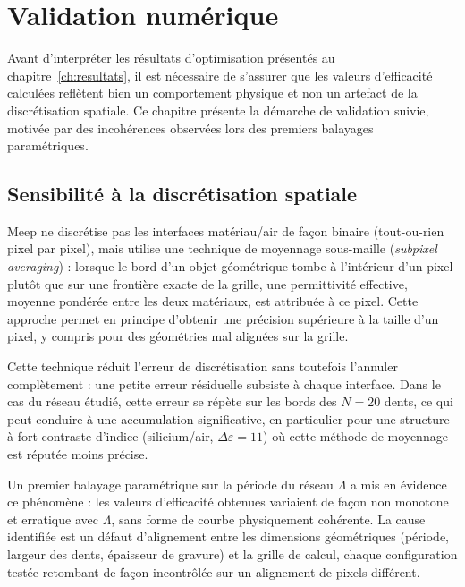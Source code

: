 \documentclass[a4paper,11pt]{report}
\begin{document}
\chapter{Validation numérique}
\label{ch:validation}


Avant d'interpréter les résultats d'optimisation présentés au chapitre~\ref{ch:resultats}, il est nécessaire de s'assurer que les valeurs d'efficacité calculées reflètent bien un comportement physique et non un artefact de la discrétisation spatiale. Ce chapitre présente la démarche de validation suivie, motivée par des incohérences observées lors des premiers balayages paramétriques.

\section{Sensibilité à la discrétisation spatiale}

Meep ne discrétise pas les interfaces matériau/air de façon binaire (tout-ou-rien pixel par pixel), mais utilise une technique de moyennage sous-maille (\emph{subpixel averaging}) : lorsque le bord d'un objet géométrique tombe à l'intérieur d'un pixel plutôt que sur une frontière exacte de la grille, une permittivité effective, moyenne pondérée entre les deux matériaux, est attribuée à ce pixel. Cette approche permet en principe d'obtenir une précision supérieure à la taille d'un pixel, y compris pour des géométries mal alignées sur la grille.

Cette technique réduit l'erreur de discrétisation sans toutefois l'annuler complètement : une petite erreur résiduelle subsiste à chaque interface. Dans le cas du réseau étudié, cette erreur se répète sur les bords des $N=20$ dents, ce qui peut conduire à une accumulation significative, en particulier pour une structure à fort contraste d'indice (silicium/air, $\Delta\varepsilon=11$) où cette méthode de moyennage est réputée moins précise.

Un premier balayage paramétrique sur la période du réseau $\Lambda$ a mis en évidence ce phénomène : les valeurs d'efficacité obtenues variaient de façon non monotone et erratique avec $\Lambda$, sans forme de courbe physiquement cohérente. La cause identifiée est un défaut d'alignement entre les dimensions géométriques (période, largeur des dents, épaisseur de gravure) et la grille de calcul, chaque configuration testée retombant de façon incontrôlée sur un alignement de pixels différent.
\end{document}
